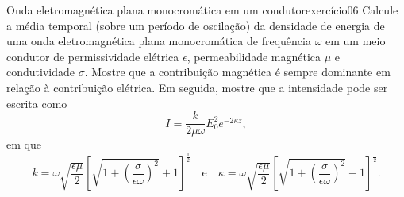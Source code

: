 \begin{exercício}{Onda eletromagnética plana monocromática em um condutor}{exercício06}
    Calcule a média temporal (sobre um período de oscilação) da densidade de energia de uma onda eletromagnética plana monocromática de frequência \(\omega\) em um meio condutor de permissividade elétrica \(\epsilon\), permeabilidade magnética \(\mu\) e condutividade \(\sigma\). Mostre que a contribuição magnética é sempre dominante em relação à contribuição elétrica. Em seguida, mostre que a intensidade pode ser escrita como
    \begin{equation*}
        I = \frac{k}{2\mu \omega} E_0^2 e^{-2 \kappa z},
    \end{equation*}
    em que
    \begin{equation*}
        k = \omega \sqrt{\frac{\epsilon \mu}{2}}\left[\sqrt{1 + \left(\frac{\sigma}{\epsilon \omega}\right)^2} + 1\right]^{\frac12}\quad\text{e}\quad
        \kappa = \omega \sqrt{\frac{\epsilon \mu}{2}}\left[\sqrt{1 + \left(\frac{\sigma}{\epsilon \omega}\right)^2} - 1\right]^{\frac12}.
    \end{equation*}
\end{exercício}
